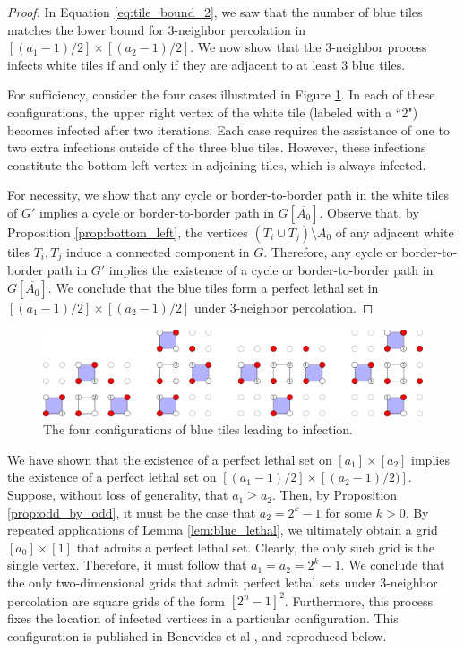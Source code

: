 \begin{proof}
In Equation \ref{eq:tile_bound_2}, we saw that the number of blue tiles matches the lower bound for 3-neighbor percolation in $[(a_1-1)/2] \times [(a_2-1)/2]$. We now show that the 3-neighbor process infects white tiles if and only if they are adjacent to at least 3 blue tiles.

For sufficiency, consider the four cases illustrated in Figure \ref{fig:tile_infection}. In each of these configurations, the upper right vertex of the white tile (labeled with a ``2") becomes infected after two iterations. Each case requires the assistance of one to two extra infections outside of the three blue tiles. However, these infections constitute the bottom left vertex in adjoining tiles, which is always infected.

For necessity, we show that any cycle or border-to-border path in the white tiles of $G'$ implies a cycle or border-to-border path in $G[\overline{A_0}]$. Observe that, by Proposition \ref{prop:bottom_left}, the vertices $(T_i \cup T_{j}) \setminus A_0$ of any adjacent white tiles $T_i, T_j$ induce a connected component in $G$. Therefore, any cycle or border-to-border path in $G'$ implies the existence of a cycle or border-to-border path in $G[\overline{A_0}]$. We conclude that the blue tiles form a perfect lethal set in $[(a_1-1)/2] \times [(a_2-1)/2]$ under 3-neighbor percolation.
\end{proof}

\begin{figure}[]
\centering
\includegraphics[width=\textwidth]{figures/6/tile_infection.pdf}
\caption{The four configurations of blue tiles leading to infection.}
\label{fig:tile_infection}
\end{figure} 


We have shown that the existence of a perfect lethal set on $[a_1] \times [a_2]$ implies the existence of a perfect lethal set on $[(a_1-1)/2] \times [(a_2-1)/2)]$. Suppose, without loss of generality, that $a_1 \geq a_2$. Then, by Proposition \ref{prop:odd_by_odd}, it must be the case that $a_2 = 2^{k}-1$ for some $k> 0$. By repeated applications of Lemma \ref{lem:blue_lethal}, we ultimately obtain a grid $[a_0] \times [1]$ that admits a perfect lethal set. Clearly, the only such grid is the single vertex. Therefore, it must follow that $a_1 = a_2 = 2^k-1$. We conclude that the only two-dimensional grids that admit perfect lethal sets under 3-neighbor percolation are square grids of the form $[2^n-1]^2$. Furthermore, this process fixes the location of infected vertices in a particular configuration. This configuration is published in Benevides et al \cite{benevides:2021}, and reproduced below.

